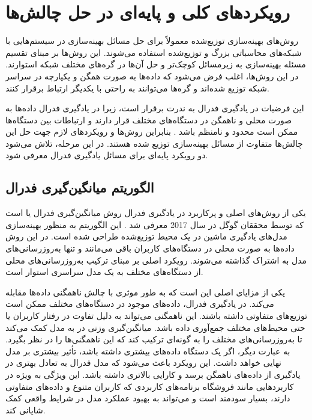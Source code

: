 \section{رویکردهای کلی و پایه‌ای در حل چالش‌ها}
روش‌های بهینه‌سازی توزیع‌شده معمولاً برای حل مسائل بهینه‌سازی در سیستم‌هایی با شبکه‌های محاسباتی بزرگ و توزیع‌شده استفاده می‌شوند. این روش‌ها بر مبنای تقسیم مسئله بهینه‌سازی به زیرمسائل کوچک‌تر و حل آن‌ها در گره‌های مختلف شبکه استوارند. در این روش‌ها، اغلب فرض می‌شود که داده‌ها به صورت همگن و یکپارچه در سراسر شبکه توزیع شده‌اند و گره‌ها می‌توانند به راحتی با یکدیگر ارتباط برقرار کنند.

این فرضیات در یادگیری فدرال به ندرت برقرار است، زیرا در یادگیری فدرال داده‌ها به صورت محلی و ناهمگن در دستگاه‌های مختلف قرار دارند و ارتباطات بین دستگاه‌ها ممکن است محدود و نامنظم باشد
\cite{konevcny2015federated}.
بنابراین روش‌ها و رویکردهای لازم جهت حل این چالش‌ها متفاوت از مسائل بهینه‌سازی توزیع شده هستند. در این مرحله، تلاش می‌شود دو رویکرد پایه‌ای برای مسائل یادگیری فدرال معرفی شود.


\subsection{
	الگوریتم میانگین‌گیری فدرال%
}
یکی از روش‌های اصلی و پرکاربرد در یادگیری فدرال روش میانگین‌گیری فدرال یا
است که توسط محققان گوگل در سال 2017 معرفی شد
\cite{mcmahan2017communication}.
این الگوریتم به منظور بهینه‌سازی مدل‌های یادگیری ماشین در یک محیط توزیع‌شده طراحی شده است. در این روش داده‌ها به صورت محلی در دستگاه‌های کاربران باقی می‌مانند و تنها به‌روزرسانی‌های مدل به اشتراک گذاشته می‌شوند. رویکرد اصلی
بر مبنای ترکیب به‌روزرسانی‌های محلی از دستگاه‌های مختلف به یک مدل سراسری استوار است.


یکی از مزایای اصلی
این است که به طور موثری با چالش ناهمگنی داده‌ها مقابله می‌کند. در یادگیری فدرال، داده‌های موجود در دستگاه‌های مختلف ممکن است توزیع‌های متفاوتی داشته باشند. این ناهمگنی می‌تواند به دلیل تفاوت در رفتار کاربران یا حتی محیط‌های مختلف جمع‌آوری داده باشد. میانگین‌گیری وزنی در
به مدل کمک می‌کند تا به‌روزرسانی‌های مختلف را به گونه‌ای ترکیب کند که این ناهمگنی‌ها را در نظر بگیرد. به عبارت دیگر، اگر یک دستگاه داده‌های بیشتری داشته باشد، تأثیر بیشتری بر مدل نهایی خواهد داشت. این رویکرد باعث می‌شود که مدل فدرال به تعادل بهتری در یادگیری از داده‌های ناهمگن برسد و کارایی بالاتری داشته باشد. این ویژگی به ویژه در کاربردهایی مانند فروشگاه برنامه‌های کاربردی که کاربران متنوع و داده‌های متفاوتی دارند، بسیار سودمند است و می‌تواند به بهبود عملکرد مدل در شرایط واقعی کمک شایانی کند.

